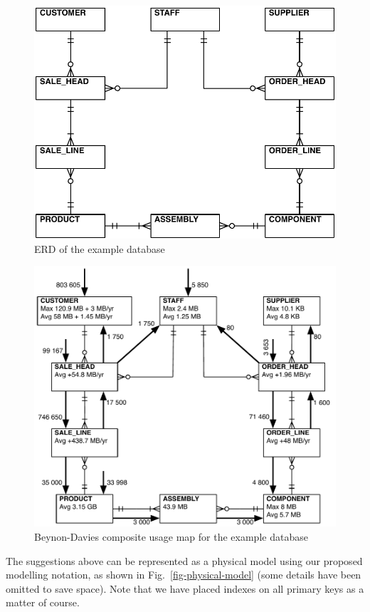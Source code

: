 \documentclass{llncs}
\begin{document}
\begin{figure}
	\includegraphics[width=\columnwidth,keepaspectratio]{ERD}
	\caption{ERD of the example database}
	\label{fig-ERD}
\end{figure}

\begin{figure}
	\includegraphics[width=\columnwidth,keepaspectratio]{Beynon-Davies}
	\caption{Beynon-Davies composite usage map for the example database}
	\label{fig-Beynon-Davies}
\end{figure}

The suggestions above can be represented as a physical model using our
proposed modelling notation, as shown in Fig.~\ref{fig-physical-model}
(some details have been omitted to save space). Note that we have placed
indexes on all primary keys as a matter of course.
\end{document}

